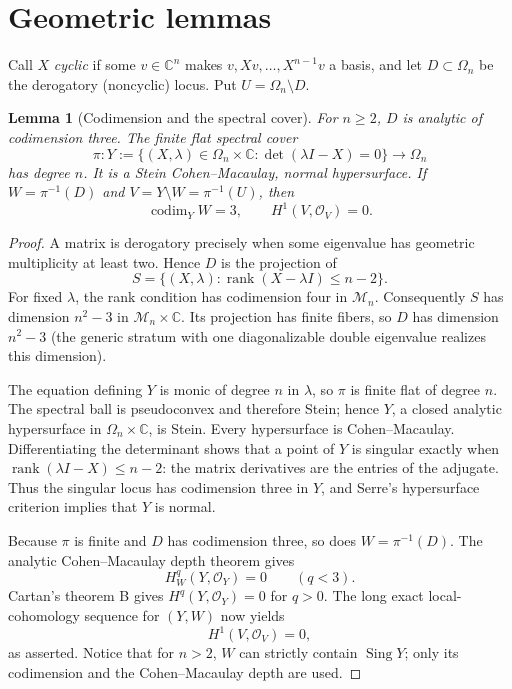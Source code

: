 \documentclass[11pt]{article}
\newtheorem{lemma}[theorem]{Lemma}
\newcommand{\Om}{\Omega_n}
\newcommand{\M}{\mathcal M_n}
\newcommand{\OO}{\mathcal O}
\newcommand{\C}{\mathbb C}
\begin{document}
\section{Geometric lemmas}
Call $X$ \emph{cyclic} if some $v\in\C^n$ makes
$v,Xv,\ldots,X^{n-1}v$ a basis, and let $D\subset\Om$ be the derogatory
(noncyclic) locus.  Put $U=\Om\setminus D$.

\begin{lemma}[Codimension and the spectral cover]\label{lem:geometry}
For $n\ge2$, $D$ is analytic of codimension three.  The finite flat spectral
cover
\[
 \pi:Y:=\{(X,\lambda)\in\Om\times\C:
          \det(\lambda I-X)=0\}\longrightarrow\Om
\]
has degree $n$.  It is a Stein Cohen--Macaulay, normal hypersurface.  If
$W=\pi^{-1}(D)$ and $V=Y\setminus W=\pi^{-1}(U)$, then
\[
 \operatorname{codim}_Y W=3,
 \qquad H^1(V,\OO_V)=0.
\]
\end{lemma}

\begin{proof}
A matrix is derogatory precisely when some eigenvalue has geometric
multiplicity at least two.  Hence $D$ is the projection of
\[
 S=\{(X,\lambda):\operatorname{rank}(X-\lambda I)\le n-2\}.
\]
For fixed $\lambda$, the rank condition has codimension four in $\M$.
Consequently $S$ has dimension $n^2-3$ in $\M\times\C$.  Its projection has
finite fibers, so $D$ has dimension $n^2-3$ (the generic stratum with one
diagonalizable double eigenvalue realizes this dimension).

The equation defining $Y$ is monic of degree $n$ in $\lambda$, so $\pi$ is
finite flat of degree $n$.  The spectral ball is pseudoconvex and therefore
Stein; hence $Y$, a closed analytic hypersurface in $\Om\times\C$, is Stein.
Every hypersurface is Cohen--Macaulay.  Differentiating the determinant shows
that a point of $Y$ is singular exactly when
$\operatorname{rank}(\lambda I-X)\le n-2$: the matrix derivatives are the
entries of the adjugate.  Thus the singular locus has codimension three in
$Y$, and Serre's hypersurface criterion implies that $Y$ is normal.

Because $\pi$ is finite and $D$ has codimension three, so does
$W=\pi^{-1}(D)$.  The analytic Cohen--Macaulay depth theorem
\cite{BanicaStanasila} gives
\[
 H^q_W(Y,\OO_Y)=0\qquad(q<3).
\]
Cartan's theorem B \cite{GrauertRemmert} gives
$H^q(Y,\OO_Y)=0$ for $q>0$.  The long exact
local-cohomology sequence for $(Y,W)$ now yields
\[
 H^1(V,\OO_V)=0,
\]
as asserted.  Notice that for $n>2$, $W$ can strictly contain
$\operatorname{Sing}Y$; only its codimension and the Cohen--Macaulay depth are
used.
\end{proof}
\end{document}
